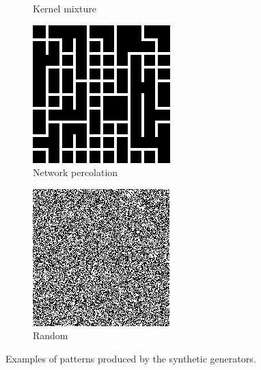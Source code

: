 \documentclass[letterpaper]{article}
\begin{document}
\begin{figure}
\begin{subfigure}[b]{0.2\textwidth}
        \caption{Kernel mixture}
        \label{fig:mixture}
    \end{subfigure}
    \begin{subfigure}[b]{0.2\textwidth}
        \includegraphics[width=\textwidth]{percolation}
        \caption{Network percolation}
        \label{fig:percolation}
    \end{subfigure}
    \begin{subfigure}[b]{0.2\textwidth}
        \includegraphics[width=\textwidth]{random}
        \caption{Random}
        \label{fig:random}
    \end{subfigure}
    \caption{Examples of patterns produced by the synthetic generators.}
    \label{fig:generators}
\end{figure}
\end{document}
